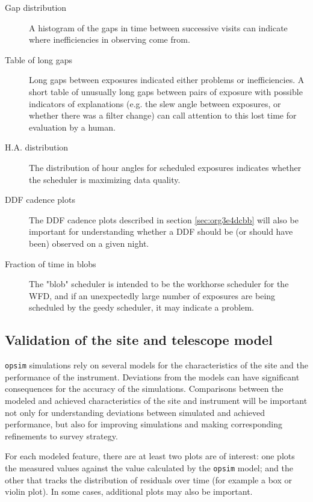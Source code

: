 \begin{description}
\item[{Gap distribution}] A histogram of the gaps in time between successive visits can indicate where inefficiencies in observing come from.
\item[{Table of long gaps}] Long gaps between exposures indicated either problems or inefficiencies. A short table of unusually long gaps between pairs of exposure with possible indicators of explanations (e.g. the slew angle between exposures, or whether there was a filter change) can call attention to this lost time for evaluation by a human.
\item[{H.A. distribution}] The distribution of hour angles for scheduled exposures indicates whether the scheduler is maximizing data quality.
\item[{DDF cadence plots}] The DDF cadence plots described in section \ref{sec:org3e4dcbb} will also be important for understanding whether a DDF should be (or should have been) observed on a given night.
\item[{Fraction of time in blobs}] The "blob" scheduler is intended to be the workhorse scheduler for the WFD, and if an unexpectedly large number of exposures are being scheduled by the geedy scheduler, it may indicate a problem.
\end{description}

\subsection{Validation of the site and telescope model}
\label{sec:org95bebe9}
\texttt{opsim} simulations rely on several models for the characteristics of the site and the performance of the instrument.
Deviations from the models can have significant consequences for the accuracy of the simulations.
Comparisons between the modeled and achieved characteristics of the site and instrument will be important not only for understanding deviations between simulated and achieved performance, but also for improving simulations and making corresponding refinements to survey strategy.

For each modeled feature, there are at least two plots are of interest: one plots the measured values against the value calculated by the \texttt{opsim} model; and the other that tracks the distribution of residuals over time (for example a box or violin plot).
In some cases, additional plots may also be important.

